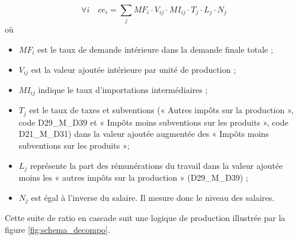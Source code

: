 \begin{equation}
\forall i \quad ce_i = \sum_j MF_i \cdot V_{ij} \cdot MI_{ij} \cdot T_j \cdot L_j \cdot N_j
\end{equation}
où
\begin{itemize}
	\item $MF_i $ est le taux de demande intérieure dans la demande finale totale ;
	\item $V_{ij}$ est la valeur ajoutée intérieure par unité de production ;
	\item $MI_{ij}$ indique le taux d'importations intermédiaires ;
	\item $T_j$ est le taux de taxes et subventions (« Autres impôts sur la production », code D29\_M\_D39 et « Impôts moins subventions sur les produits », code D21\_M\_D31) dans la valeur ajoutée augmentée des « Impôts moins subventions sur les produits »;
	\item $L_j$ représente la part des rémunérations du travail dans la valeur ajoutée moins les « autres impôts sur la production » (D29\_M\_D39) ;
	\item $N_j$ est égal à l’inverse du salaire. Il mesure donc le niveau des salaires.
\end{itemize}

Cette suite de ratio en cascade suit une logique de production illustrée par la figure \ref{fig:schema_decompo}.

